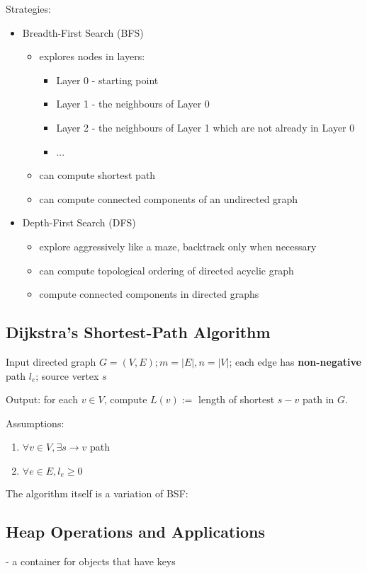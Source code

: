 \documentclass{scrartcl}
\begin{document}
Strategies:
\begin{itemize}
\item Breadth-First Search (BFS)
  \begin{itemize}
  \item explores nodes in layers:
    \begin{itemize}
    \item Layer 0 - starting point
    \item Layer 1 - the neighbours of Layer 0
    \item Layer 2 - the neighbours of Layer 1 which are not already in Layer 0
    \item ...
    \end{itemize}
  \item can compute shortest path
  \item can compute connected components of an undirected graph
  \end{itemize}
\item Depth-First Search (DFS)
  \begin{itemize}
  \item explore aggressively like a maze, backtrack only when necessary
  \item can compute topological ordering of directed acyclic graph
  \item compute connected components in directed graphs
  \end{itemize}
\end{itemize}

\subsection{Dijkstra's Shortest-Path Algorithm}
\label{sec:Dijkstra}
Input directed graph $G = (V, E); m = |E|, n = |V|$; each edge has {\bf
  non-negative} path $l_e$; source vertex $s$

Output: for each $v \in V$, compute $L(v) :=$ length of shortest $s-v$ path in
$G$.

Assumptions:
\begin{enumerate}
\item $\forall v \in V, \exists s \rightarrow v$ path
\item $\forall e \in E, l_e \ge 0$
\end{enumerate}
The algorithm itself is a variation of BSF:

\subsection{Heap Operations and Applications}
\label{sec:DataHeap}
- a container for objects that have keys
\end{document}
